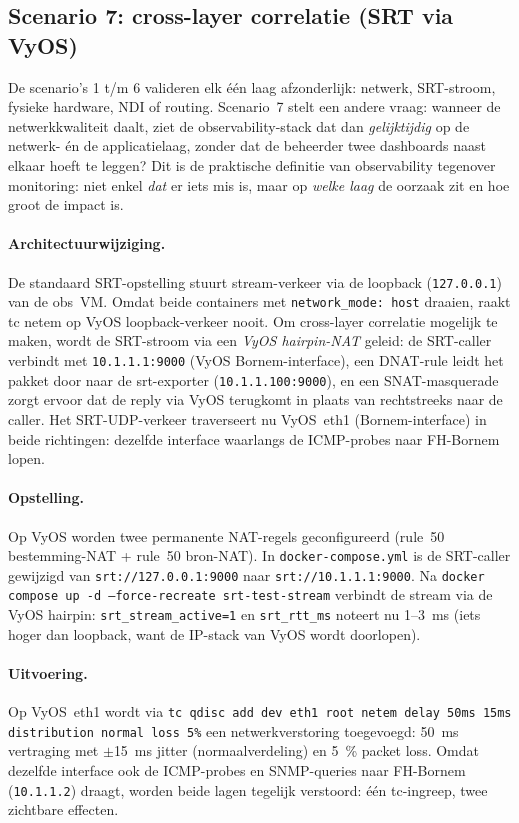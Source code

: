 \subsection{Scenario 7: cross-layer correlatie (SRT via VyOS)}
\label{sec:scenario-7}

De scenario's 1 t/m 6 valideren elk één laag afzonderlijk: netwerk, SRT-stroom, fysieke hardware, NDI of routing. Scenario~7 stelt een andere vraag: wanneer de netwerkkwaliteit daalt, ziet de observability-stack dat dan \emph{gelijktijdig} op de netwerk- én de applicatielaag, zonder dat de beheerder twee dashboards naast elkaar hoeft te leggen? Dit is de praktische definitie van observability tegenover monitoring: niet enkel \emph{dat} er iets mis is, maar op \emph{welke laag} de oorzaak zit en hoe groot de impact is.

\paragraph{Architectuurwijziging.}
De standaard SRT-opstelling stuurt stream-verkeer via de loopback (\texttt{127.0.0.1}) van de obs~VM. Omdat beide containers met \texttt{network\_mode: host} draaien, raakt tc netem op VyOS loopback-verkeer nooit. Om cross-layer correlatie mogelijk te maken, wordt de SRT-stroom via een \emph{VyOS hairpin-NAT} geleid: de SRT-caller verbindt met \texttt{10.1.1.1:9000} (VyOS Bornem-interface), een DNAT-rule leidt het pakket door naar de srt-exporter (\texttt{10.1.1.100:9000}), en een SNAT-masquerade zorgt ervoor dat de reply via VyOS terugkomt in plaats van rechtstreeks naar de caller. Het SRT-UDP-verkeer traverseert nu VyOS~eth1 (Bornem-interface) in beide richtingen: dezelfde interface waarlangs de ICMP-probes naar FH-Bornem lopen.

\paragraph{Opstelling.}
Op VyOS worden twee permanente NAT-regels geconfigureerd (rule~50 bestemming-NAT + rule~50 bron-NAT). In \texttt{docker-compose.yml} is de SRT-caller gewijzigd van \texttt{srt://127.0.0.1:9000} naar \texttt{srt://10.1.1.1:9000}. Na \texttt{docker compose up -d --force-recreate srt-test-stream} verbindt de stream via de VyOS hairpin: \texttt{srt\_stream\_active=1} en \texttt{srt\_rtt\_ms} noteert nu 1--3~ms (iets hoger dan loopback, want de IP-stack van VyOS wordt doorlopen).

\paragraph{Uitvoering.}
Op VyOS~eth1 wordt via \texttt{tc qdisc add dev eth1 root netem delay 50ms 15ms distribution normal loss 5\%} een netwerkverstoring toegevoegd: 50~ms vertraging met $\pm$15~ms jitter (normaalverdeling) en 5~\% packet loss. Omdat dezelfde interface ook de ICMP-probes en SNMP-queries naar FH-Bornem (\texttt{10.1.1.2}) draagt, worden beide lagen tegelijk verstoord: één tc-ingreep, twee zichtbare effecten.

